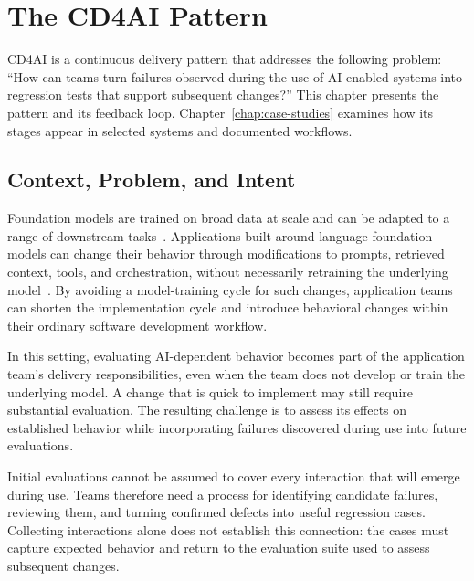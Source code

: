 \chapter{The CD4AI Pattern}
\label{chap:cd4ai}

CD4AI is a continuous delivery pattern that addresses the following problem:
\enquote{How can teams turn failures observed during the use of AI-enabled
systems into regression tests that support subsequent changes?}
This chapter presents the pattern and its feedback loop.
Chapter~\ref{chap:case-studies} examines how its stages appear in selected
systems and documented workflows.

\section{Context, Problem, and Intent}
\label{sec:cd4ai-context}


Foundation models are trained on broad data at scale and can be adapted to
a range of downstream tasks~\cite{Bommasani:FoundationModels:2021}.
Applications built around language foundation models can change their behavior
through modifications to prompts, retrieved context, tools, and orchestration,
without necessarily retraining the underlying
model~\cite{Schluntz:BuildingEffectiveAgents:2024}.
By avoiding a model-training cycle for such changes, application teams can
shorten the implementation cycle and introduce behavioral changes within their
ordinary software development workflow.

In this setting, evaluating AI-dependent behavior becomes part of the
application team's delivery responsibilities, even when the team does not
develop or train the underlying model. A change that is quick to implement
may still require substantial evaluation. The resulting challenge is to assess
its effects on established behavior while incorporating failures discovered
during use into future evaluations.



Initial evaluations cannot be assumed to cover every interaction that will
emerge during use. Teams therefore need a process for identifying candidate
failures, reviewing them, and turning confirmed defects into useful regression
cases. Collecting interactions alone does not establish this connection: the
cases must capture expected behavior and return to the evaluation suite used
to assess subsequent changes.

